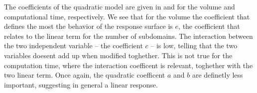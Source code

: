 The coefficients of the quadratic model are given in  and  for the volume and computational time, respectively. We see that for the volume the coefficient that defines the most the behavior of the response surface is $e$, the coefficient that relates to the linear term for the number of subdomains. The interaction between the two independent variable -- the coefficient $c$ -- is low, telling that the two variables doesent add up when modified toghether. This is not true for the computation time, where the interaction coefficent is relevant, toghether with the two linear term. Once again, the quadratic coefficent $a$ and $b$ are definetly less important, suggesting in general a linear response.

\begin{figure}
    \hspace*{\fill}
    \hfill

\end{figure}
